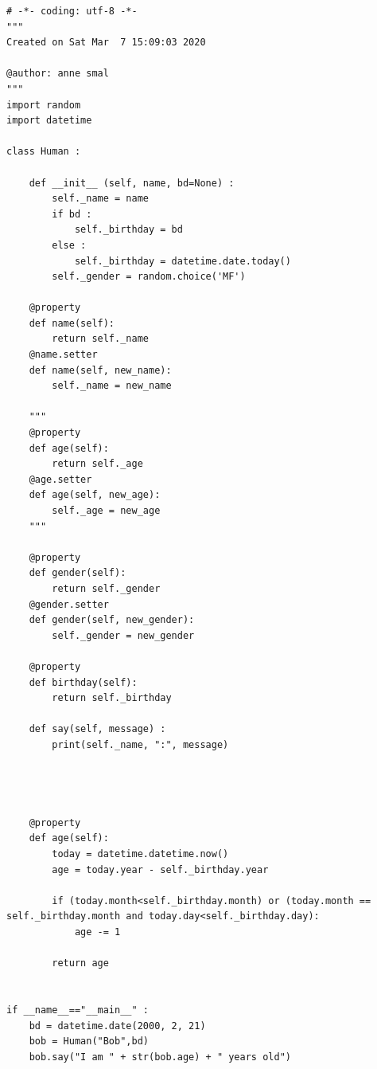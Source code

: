 \documentclass[a4paper, letterpaper]{report}
\begin{document}
\begin{lstlisting}[style=Pythonstyle]
    # -*- coding: utf-8 -*-
"""
Created on Sat Mar  7 15:09:03 2020

@author: anne smal
"""
import random 
import datetime

class Human :
  
    def __init__ (self, name, bd=None) :
        self._name = name
        if bd :
            self._birthday = bd
        else :
            self._birthday = datetime.date.today()
        self._gender = random.choice('MF')

    @property
    def name(self):
        return self._name
    @name.setter
    def name(self, new_name):
        self._name = new_name
        
    """
    @property
    def age(self):
        return self._age
    @age.setter
    def age(self, new_age):
        self._age = new_age
    """
    
    @property
    def gender(self):
        return self._gender
    @gender.setter
    def gender(self, new_gender):
        self._gender = new_gender
        
    @property
    def birthday(self):
        return self._birthday
    
    def say(self, message) :
        print(self._name, ":", message)
        
        

    
    @property
    def age(self):
        today = datetime.datetime.now()
        age = today.year - self._birthday.year
        
        if (today.month<self._birthday.month) or (today.month == self._birthday.month and today.day<self._birthday.day):
            age -= 1
            
        return age    
        
        
if __name__=="__main__" :
    bd = datetime.date(2000, 2, 21)
    bob = Human("Bob",bd)    
    bob.say("I am " + str(bob.age) + " years old")
\end{lstlisting}
\end{document}
